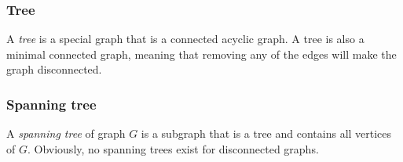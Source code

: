       \subsubsection{Tree}

        A \emph{tree} is a special graph that is a connected acyclic graph. A tree is also a minimal connected graph, meaning that removing any of the edges will make the graph disconnected.

      \subsubsection{Spanning tree}

        A \emph{spanning tree} of graph $G$ is a subgraph that is a tree and contains all vertices of $G$. Obviously, no spanning trees exist for disconnected graphs.
        
